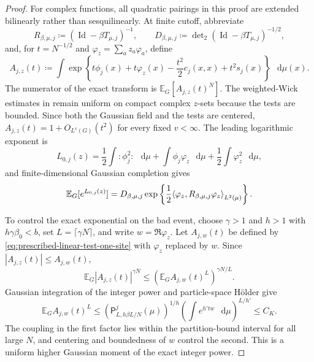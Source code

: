 \documentclass[11pt,reqno]{amsart}
\numberwithin{equation}{section}
\theoremstyle{plain}
\theoremstyle{definition}
\DeclarePairedDelimiter{\ip}{\langle}{\rangle}
\newcommand{\dd}{\mathop{}\!\mathrm d}
\newcommand{\E}{\mathbb E}
\newcommand{\Id}{\operatorname{Id}}
\newcommand{\be}{\beta}
\begin{document}
\begin{proof}
For complex functions, all quadratic pairings in this proof are extended bilinearly rather than sesquilinearly.  At finite cutoff, abbreviate
\begin{equation}
 R_{\be,\mu,j}\coloneqq(\Id-\be T_{\mu,j})^{-1},
 \qquad
 D_{\be,\mu,j}\coloneqq\det\nolimits_2(\Id-\be T_{\mu,j})^{-1/2},
 \label{eq:prescribed-linear-cutoff-response}
\end{equation}
and, for $t=N^{-1/2}$ and $\varphi_z=\sum_az_a\varphi_a$, define
\begin{equation}
 A_{j,z}(t)\coloneqq\int\exp\left\{t\phi_j(x)+t\varphi_z(x)
 -\frac{t^2}{2}c_j(x,x)+t^2s_j(x)\right\}\,\dd\mu(x).
 \label{eq:prescribed-linear-test-one-site}
\end{equation}
The numerator of the exact transform is $\E_G[A_{j,z}(t)^N]$.  The weighted-Wick estimates in  remain uniform on compact complex $z$-sets because the tests are bounded.  Since both the Gaussian field and the tests are centered, $A_{j,z}(t)=1+O_{L^v(G)}(t^2)$ for every fixed $v<\infty$.  The leading logarithmic exponent is
\begin{equation}
 L_{0,j}(z)
 =\frac12\int:\!\phi_j^2\!:\,\dd\mu
 +\int\phi_j\varphi_z\,\dd\mu
 +\frac12\int\varphi_z^2\,\dd\mu,
 \label{eq:prescribed-linear-leading-exponent}
\end{equation}
and finite-dimensional Gaussian completion gives
\begin{equation}
 \E_G[e^{L_{0,j}(z)}]
 =D_{\be,\mu,j}
 \exp\left\{\frac12\ip*{\varphi_z,R_{\be,\mu,j}\varphi_z}_{L^2(\mu)}\right\}.
 \label{eq:prescribed-linear-leading-Gaussian}
\end{equation}

To control the exact exponential on the bad event, choose $\gamma>1$ and $h>1$ with $h\gamma\be_0<b$, set $L=\lceil\gamma N\rceil$, and write $w=\Re\varphi_z$.  Let $A_{j,w}(t)$ be defined by \eqref{eq:prescribed-linear-test-one-site} with $\varphi_z$ replaced by $w$.  Since $|A_{j,z}(t)|\leq A_{j,w}(t)$,
\begin{equation}
 \E_G|A_{j,z}(t)|^{\gamma N}
 \leq\left(\E_GA_{j,w}(t)^L\right)^{\gamma N/L}.
 \label{eq:prescribed-linear-higher-Gaussian-moment}
\end{equation}
Gaussian integration of the integer power and particle-space H\"older give
\begin{equation}
 \E_GA_{j,w}(t)^L
 \leq\left(\mathsf P^j_{L,h\be L/N}(\mu)\right)^{1/h}
 \left(\int e^{h'tw}\,\dd\mu\right)^{L/h'}\leq C_K.
 \label{eq:prescribed-linear-particle-holder}
\end{equation}
The coupling in the first factor lies within the partition-bound interval for all large $N$, and centering and boundedness of $w$ control the second.  This is a uniform higher Gaussian moment of the exact integer power.


\end{proof}
\end{document}
